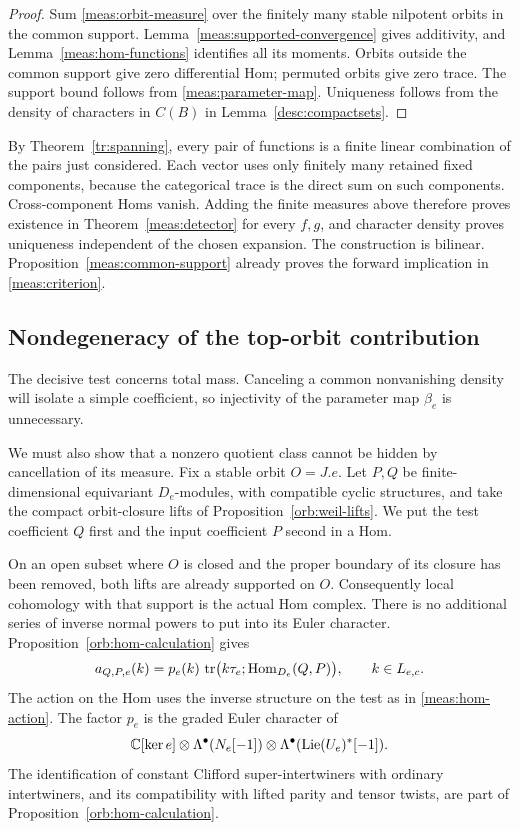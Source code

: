 \begin{proof}
Sum \eqref{meas:orbit-measure} over the finitely many stable nilpotent
orbits in the common support.  Lemma~\ref{meas:supported-convergence}
gives additivity, and Lemma~\ref{meas:hom-functions} identifies all its
moments.  Orbits outside the common support give zero differential Hom;
permuted orbits give zero trace.  The support bound follows from
\eqref{meas:parameter-map}.  Uniqueness follows from the density of
characters in $C(B)$ in Lemma~\ref{desc:compactsets}.
\end{proof}

By Theorem~\ref{tr:spanning}, every pair of functions is a finite linear
combination of the pairs just considered.  Each vector uses only finitely
many retained fixed components, because the categorical trace is the
direct sum on such components.  Cross-component Homs vanish.  Adding the
finite measures above therefore proves existence in
Theorem~\ref{meas:detector} for every $f,g$, and character density proves
uniqueness independent of the chosen expansion.  The construction is
bilinear.  Proposition~\ref{meas:common-support} already proves the forward
implication in \eqref{meas:criterion}.

\subsection{Nondegeneracy of the top-orbit contribution}

The decisive test concerns total mass. Canceling a common nonvanishing
density will isolate a simple coefficient, so injectivity of the
parameter map $\beta_e$ is unnecessary.

We must also show that a nonzero quotient class cannot be hidden by
cancellation of its measure.  Fix a stable orbit $O=J.e$.  Let $P,Q$ be
finite-dimensional equivariant $D_e$-modules, with compatible cyclic
structures, and take the compact orbit-closure lifts of
Proposition~\ref{orb:weil-lifts}.  We put the test coefficient $Q$ first
and the input coefficient $P$ second in a Hom.

On an open subset where $O$ is closed and the proper boundary of its
closure has been removed, both lifts are already supported on $O$.
Consequently local cohomology with that support is the actual Hom
complex.  There is no additional series of inverse normal powers to put
into its Euler character.  Proposition~\ref{orb:hom-calculation} gives
\begin{equation}\label{meas:top-density}
 a_{Q,P,e}(k)=p_e(k)\,
     \operatorname{tr}\bigl(k\tau_e;\operatorname{Hom}_{D_e}(Q,P)\bigr),
 \qquad k\in L_{e,c}.
\end{equation}
The action on the Hom uses the inverse structure on the test as in
\eqref{meas:hom-action}.  The factor $p_e$ is the graded Euler character of
\begin{equation}\label{meas:universal-density-factors}
 \mathbb C[\ker e]\otimes
 \Lambda^\bullet(N_e[-1])\otimes
 \Lambda^\bullet(\operatorname{Lie}(U_e)^*[-1]).
\end{equation}
The identification of constant Clifford super-intertwiners with ordinary
intertwiners, and its compatibility with lifted parity and tensor twists,
are part of Proposition~\ref{orb:hom-calculation}.

